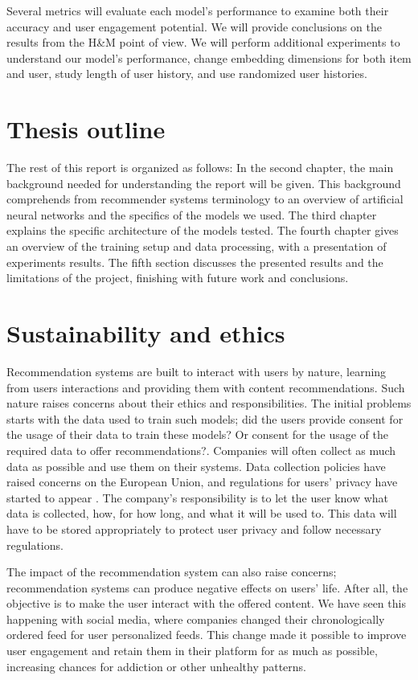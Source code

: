 \documentclass{kththesis}
\begin{document}
Several metrics will evaluate each model's performance to examine both their accuracy and user engagement potential. We will provide conclusions on the results from the H\&M point of view. We will perform additional experiments to understand our model's performance, change embedding dimensions for both item and user, study length of user history, and use randomized user histories.

\section{Thesis outline}
The rest of this report is organized as follows: In the second chapter, the main background needed for understanding the report will be given. This background comprehends from recommender systems terminology to an overview of artificial neural networks and the specifics of the models we used. The third chapter explains the specific architecture of the models tested. The fourth chapter gives an overview of the training setup and data processing, with a presentation of experiments results. The fifth section discusses the presented results and the limitations of the project, finishing with future work and conclusions.

\section{Sustainability and ethics}
Recommendation systems are built to interact with users by nature, learning from users interactions and providing them with content recommendations. Such nature raises concerns about their ethics and responsibilities. The initial problems starts with the data used to train such models; did the users provide consent for the usage of their data to train these models? Or consent for the usage of the required data to offer recommendations?. Companies will often collect as much data as possible and use them on their systems. Data collection policies have raised concerns on the European Union, and regulations for users' privacy have started to appear \cite{EUdataregulations2018}. The company's responsibility is to let the user know what data is collected, how, for how long, and what it will be used to. This data will have to be stored appropriately to protect user privacy and follow necessary regulations.

The impact of the recommendation system can also raise concerns; recommendation systems can produce negative effects on users' life. After all, the objective is to make the user interact with the offered content. We have seen this happening with social media, where companies changed their chronologically ordered feed for user personalized feeds. This change made it possible to improve user engagement and retain them in their platform for as much as possible, increasing chances for addiction or other unhealthy patterns.
\end{document}
